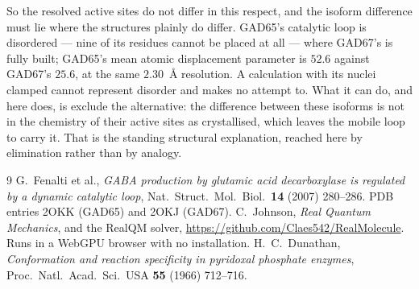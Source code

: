 \documentclass[11pt]{article}
\begin{document}
So the resolved active sites do not differ in this respect, and the isoform difference must lie where
the structures plainly do differ. GAD65's catalytic loop is disordered --- nine of its residues
cannot be placed at all --- where GAD67's is fully built; GAD65's mean atomic displacement parameter
is $52.6$ against GAD67's $25.6$, at the same $2.30$~\AA{} resolution. A calculation with its nuclei
clamped cannot represent disorder and makes no attempt to. What it can do, and here does, is exclude
the alternative: the difference between these isoforms is not in the chemistry of their active sites
as crystallised, which leaves the mobile loop to carry it. That is the standing structural
explanation, reached here by elimination rather than by analogy.

\begin{thebibliography}{9}
 G.~Fenalti et al., \emph{GABA production by glutamic acid decarboxylase is
regulated by a dynamic catalytic loop}, Nat.\ Struct.\ Mol.\ Biol.\ \textbf{14} (2007) 280--286.
PDB entries 2OKK (GAD65) and 2OKJ (GAD67).
 C.~Johnson, \emph{Real Quantum Mechanics}, and the RealQM solver,
\url{https://github.com/Claes542/RealMolecule}. Runs in a WebGPU browser with no installation.
 H.~C.~Dunathan, \emph{Conformation and reaction specificity in pyridoxal
phosphate enzymes}, Proc.\ Natl.\ Acad.\ Sci.\ USA \textbf{55} (1966) 712--716.
\end{thebibliography}
\end{document}
